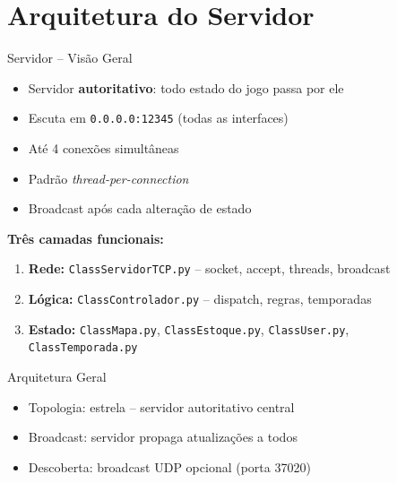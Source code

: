 \documentclass[aspectratio=169]{beamer}
\begin{document}
\section{Arquitetura do Servidor}

\begin{frame}{Servidor -- Vis\~ao Geral}
  \begin{itemize}
    \item Servidor \textbf{autoritativo}: todo estado do jogo passa por ele
    \item Escuta em \texttt{0.0.0.0:12345} (todas as interfaces)
    \item At\'e 4 conex\~oes simult\^aneas
    \item Padr\~ao \textit{thread-per-connection}
    \item Broadcast ap\'os cada altera\c{c}\~ao de estado
  \end{itemize}
  \vfill
  \textbf{Tr\^es camadas funcionais:}
  \begin{enumerate}
    \item \textbf{Rede:} \texttt{ClassServidorTCP.py} -- socket, accept, threads, broadcast
    \item \textbf{L\'ogica:} \texttt{ClassControlador.py} -- dispatch, regras, temporadas
    \item \textbf{Estado:} \texttt{ClassMapa.py}, \texttt{ClassEstoque.py}, \texttt{ClassUser.py}, \texttt{ClassTemporada.py}
  \end{enumerate}
\end{frame}

\begin{frame}{Arquitetura Geral}
  \begin{center}
  \end{center}
  \begin{itemize}
    \item Topologia: estrela -- servidor autoritativo central
    \item Broadcast: servidor propaga atualiza\c{c}\~oes a todos
    \item Descoberta: broadcast UDP opcional (porta 37020)
  \end{itemize}
\end{frame}
\end{document}
